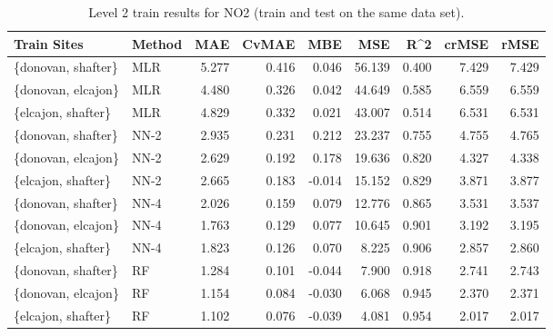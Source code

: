\begin{table}[h]
\begin{tabular}{llrrrrrrr}
\toprule
 Train Sites & Method &   MAE &  CvMAE &       MBE &     MSE &   R\textasciicircum2 &  crMSE &   rMSE \\
\midrule
\{donovan, shafter\} & MLR & 5.277 & 0.416 & 0.046 & 56.139 & 0.400 & 7.429 & 7.429\\
\{donovan, elcajon\} & MLR & 4.480 & 0.326 & 0.042 & 44.649 & 0.585 & 6.559 & 6.559\\
\{elcajon, shafter\} & MLR & 4.829 & 0.332 & 0.021 & 43.007 & 0.514 & 6.531 & 6.531\\
\{donovan, shafter\} & NN-2 & 2.935 & 0.231 & 0.212 & 23.237 & 0.755 & 4.755 & 4.765\\
\{donovan, elcajon\} & NN-2 & 2.629 & 0.192 & 0.178 & 19.636 & 0.820 & 4.327 & 4.338\\
\{elcajon, shafter\} & NN-2 & 2.665 & 0.183 & -0.014 & 15.152 & 0.829 & 3.871 & 3.877\\
\{donovan, shafter\} & NN-4 & 2.026 & 0.159 & 0.079 & 12.776 & 0.865 & 3.531 & 3.537\\
\{donovan, elcajon\} & NN-4 & 1.763 & 0.129 & 0.077 & 10.645 & 0.901 & 3.192 & 3.195\\
\{elcajon, shafter\} & NN-4 & 1.823 & 0.126 & 0.070 & 8.225 & 0.906 & 2.857 & 2.860\\
\{donovan, shafter\} & RF & 1.284 & 0.101 & -0.044 & 7.900 & 0.918 & 2.741 & 2.743\\
\{donovan, elcajon\} & RF & 1.154 & 0.084 & -0.030 & 6.068 & 0.945 & 2.370 & 2.371\\
\{elcajon, shafter\} & RF & 1.102 & 0.076 & -0.039 & 4.081 & 0.954 & 2.017 & 2.017\\
\bottomrule
\end{tabular}
\caption{Level 2 train results for NO2 (train and test on the same data set).}
\end{table}
